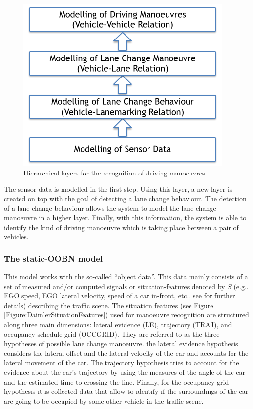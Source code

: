 \begin{figure}
\begin{center}
\includegraphics[scale=0.58]{./figures/DaimlerHierarchicalModelling}
\caption{\label{Figure:DaimlerHierarchicalModelling} Hierarchical layers for the recognition of driving manoeuvres.}
\end{center}
\end{figure}

The sensor data is modelled in the first step. Using this layer, a new layer is created on top with the goal of detecting a lane change behaviour. The detection of a lane change behaviour allows the system to model the lane change manoeuvre in a higher layer. Finally, with this information, the system is able to identify the kind of driving manoeuvre which is taking place between a pair of vehicles. 



\subsubsection{The static-OOBN model}

This model works with the so-called ``object data''. This data mainly consists of a set of measured and/or computed signals or situation-features denoted by $S$ (e.g.. EGO speed, EGO lateral velocity, speed of a car in-front, etc., see \cite{kasper2012object} for further details) describing the traffic scene. The situation features (see Figure \ref{Figure:DaimlerSituationFeatures}) used for manoeuvre recognition are structured along three main dimensions: lateral evidence (LE), trajectory (TRAJ), and occupancy schedule grid (OCCGRID).  They are referred to as the three hypotheses of possible lane change manoeuvre. the lateral evidence hypothesis considers the lateral offset and the lateral velocity of the car and accounts for the lateral movement of the car. The trajectory hypothesis tries to account for the evidence about the car's trajectory by using the measures of the angle of the car and the estimated time to crossing the line. Finally, for the occupancy grid hypothesis it is collected data that allow to identify if the surroundings of the car are going to be occupied by some other vehicle in the traffic scene. 

